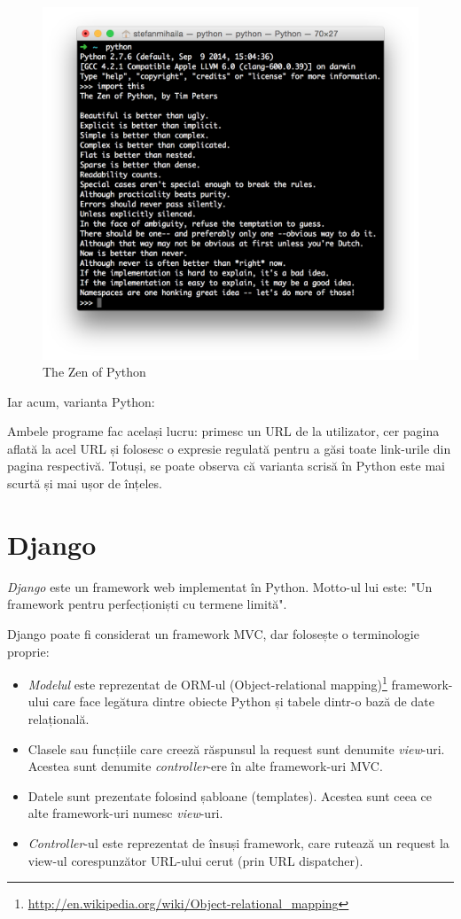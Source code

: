 \begin{figure}
  \includegraphics[width=1\textwidth]{./zen}
  \caption{The Zen of Python}
  \label{fig:zen}
\end{figure}



Iar acum, varianta Python:


Ambele programe fac același lucru: primesc un URL de la utilizator, cer pagina
aflată la acel URL și folosesc o expresie regulată pentru a găsi toate link-urile
din pagina respectivă. Totuși, se poate observa că varianta scrisă în Python
este mai scurtă și mai ușor de înțeles.


\section{Django}

\emph{Django} este un framework web implementat în Python. Motto-ul lui este: 
"Un framework pentru perfecționiști cu termene limită".

Django poate fi considerat un framework MVC, dar folosește o terminologie proprie:
\begin{itemize}
\item \emph{Modelul} este reprezentat de ORM-ul (Object-relational mapping)\footnote{\url{http://en.wikipedia.org/wiki/Object-relational\_mapping}} framework-ului care face legătura dintre obiecte Python și tabele dintr-o bază de date relațională.
\item Clasele sau funcțiile care creeză răspunsul la request sunt denumite \emph{view}-uri. Acestea sunt denumite \emph{controller}-ere în alte framework-uri MVC.
\item Datele sunt prezentate folosind șabloane (templates). Acestea sunt ceea ce alte framework-uri numesc \emph{view}-uri.
\item \emph{Controller}-ul este reprezentat de însuși framework, care rutează
un request la view-ul corespunzător URL-ului cerut (prin URL dispatcher).
\end{itemize}
